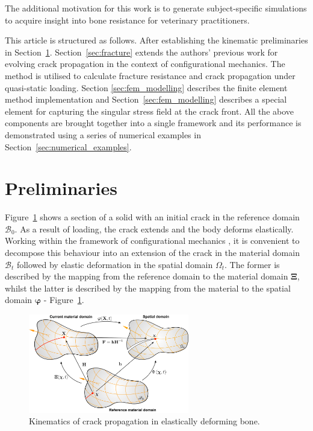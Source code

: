 \documentclass[onecolumn]{svjour3}
\begin{document}
The additional motivation for this work is to generate subject-specific simulations to acquire insight into bone resistance for veterinary practitioners.

This article is structured as follows. After establishing the kinematic preliminaries in Section~\ref{preliminaries}. Section~\ref{sec:fracture} extends the authors' previous work for evolving crack propagation in the context of configurational mechanics. The method is utilised to calculate fracture resistance and crack propagation under quasi-static loading. Section \ref{sec:fem_modelling} describes the finite element method implementation and Section~\ref{sec:fem_modelling} describes a special element for capturing the singular stress field at the crack front.  
All the above components are brought together into a single framework and its performance is demonstrated using a series of numerical examples in Section~\ref{sec:numerical_examples}.
% 
% 
\section{Preliminaries}
\label{preliminaries}
Figure~\ref{fig:domains4} shows a section of a solid with an initial crack in the reference domain $\mathscr{B}_{0}$. As a result of loading, the crack extends and the body deforms elastically. Working within the framework of configurational mechanics \cite{kaczmarczyk2014three,kienzler2014configurational}, it is convenient to decompose this behaviour into an extension of the crack in the material domain  $\mathscr{B}_t$ followed by elastic deformation in the spatial domain $\Omega_t$. The former is described by the mapping from the reference  domain to the material domain ${\boldsymbol\Xi}$, whilst the latter is described by the mapping from the material to the spatial domain ${\boldsymbol\varphi}$ - Figure~\ref{fig:domains4}.

\begin{figure}[th] 
\setlength{\fboxsep}{0pt}%
\setlength{\fboxrule}{0pt}%
\begin{center}
\includegraphics[width=7cm]{Figures/domains5.pdf} 
\end{center}
\caption{Kinematics of crack propagation in elastically deforming bone.}
\label{fig:domains4}
\end{figure}
\end{document}

